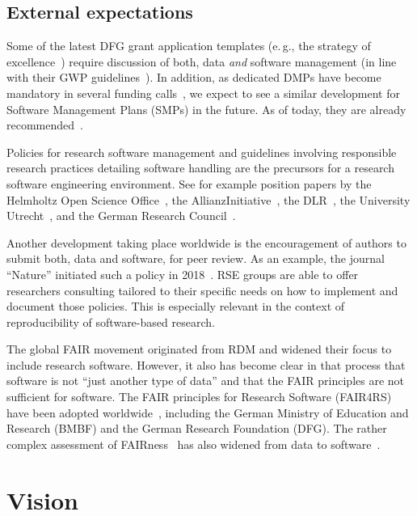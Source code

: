 \documentclass[10pt,letterpaper]{article}
\newcommand*{\eg}{e.\,g.,\xspace}
\begin{document}
\subsection*{External expectations}

Some of the latest DFG grant application templates (\eg{} the strategy of excellence~\cite{DFG_ExStra130}) require discussion of both, data \emph{and} software management (in line with their GWP guidelines~\cite{dfg_gsp}).
In addition, as dedicated DMPs have become mandatory in several funding calls~\cite{FDM_Info_FDM}, we expect to see a similar development for Software Management Plans (SMPs) in the future.
As of today, they are already recommended~\cite{FDM_Info_SMP}.

Policies for research software management and guidelines involving responsible research practices detailing software handling are the precursors for a research software engineering environment.
See for example position papers by
 the Helmholtz Open Science Office~\cite{Helmholtz2019a,Helmholtz2019b},
 the AllianzInitiative~\cite{Konrad2021},
 the DLR~\cite{Schlauch2018b},
 the University Utrecht~\cite{Utrecht2016b},
 and the German Research Council~\cite{dfg_gsp}.

Another development taking place worldwide is the encouragement of authors to submit both, data and software, for peer review.
As an example, the journal “Nature” initiated such a policy in 2018~\cite{Nature2018}.
RSE groups are able to offer researchers consulting tailored to their specific needs on how to implement and document those policies.
This is especially relevant in the context of reproducibility of software-based research.

The global FAIR movement originated from RDM and widened their focus to include research software.
However, it also has become clear in that process that software is not “just another type of data” and that the FAIR principles are not sufficient for software.
The FAIR principles for Research Software (FAIR4RS)~\cite{ChueHong2022} have been adopted worldwide~\cite{Barker2024}, including the German Ministry of Education and Research (BMBF) and the German Research Foundation (DFG).
The rather complex assessment of FAIRness~\cite{Wilkinson2023,FAIRmaturity} has also widened from data to software~\cite{Lamprecht2020}.

\section*{Vision}%
\label{sec:vision}
\end{document}

